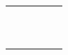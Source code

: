 \documentclass{article}
\newcommand{\addfactrow}[2]{$#1+#2=$}
\newcommand{\subfactrow}[2]{$#1-#2=$}
\newcommand{\problem}{%
   \directlua{
      a = math.random(1,10)
      b = math.random(1,10)
      c = a+b
      r = math.random()
      if (r < 0.5) then
         tex.sprint("\addfactrow{" .. a .. "}{" .. b .. "}")
      else
         tex.sprint("\subfactrow{" .. a .. "}{" .. b .. "}")
      end 
   }
}
\begin{document}
\Large

{\centering
\begin{tabularx}{\columnwidth}{*{5}{X}}
\problem & \problem & \problem & \problem & \problem \\
\problem & \problem & \problem & \problem & \problem \\
\problem & \problem & \problem & \problem & \problem \\
\problem & \problem & \problem & \problem & \problem \\
\problem & \problem & \problem & \problem & \problem \\
\problem & \problem & \problem & \problem & \problem \\
\problem & \problem & \problem & \problem & \problem \\
\problem & \problem & \problem & \problem & \problem \\
\problem & \problem & \problem & \problem & \problem \\
\problem & \problem & \problem & \problem & \problem \\
\end{tabularx}}
\end{document}
